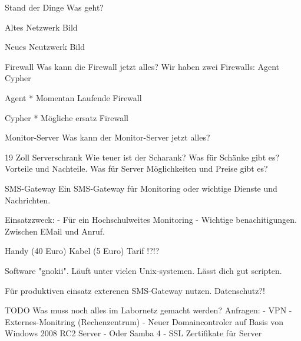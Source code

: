 \documentclass{beamer}
\author[J. Klemkow und B. Franzke]{Jan Klemkow und Benjamin Franzke}
\begin{document}
\begin{frame}{Stand der Dinge}
	Was geht?
\end{frame}

\begin{frame}{Altes Netzwerk}
	Bild
\end{frame}

\begin{frame}{Neues Neutzwerk}
	Bild
\end{frame}

\begin{frame}{Firewall}
	Was kann die Firewall jetzt alles?
	Wir haben zwei Firewalls:
		Agent
		Cypher
\end{frame}

\begin{frame}{Agent}
	* Momentan Laufende Firewall
\end{frame}

\begin{frame}{Cypher}
	* Mögliche ersatz Firewall
\end{frame}

\begin{frame}{Monitor-Server}
	Was kann der Monitor-Server jetzt alles?

\end{frame}

\begin{frame}{19 Zoll Serverschrank}
	Wie teuer ist der Scharank?
	Was für Schänke gibt es?
	Vorteile und Nachteile.
	Was für Server Möglichkeiten und Preise gibt es?
\end{frame}

\begin{frame}{SMS-Gateway}
	Ein SMS-Gateway für Monitoring oder wichtige Dienste und Nachrichten.

	Einsatzzweck:
		- Für ein Hochschulweites Monitoring
		- Wichtige benachitigungen. Zwischen EMail und Anruf.

	Handy (40 Euro)
	Kabel (5 Euro)
	Tarif !?!?

	Software "gnokii".
	Läuft unter vielen Unix-systemen.
	Lässt dich gut scripten.

	Für produktiven einsatz exterenen SMS-Gateway nutzen.
	Datenschutz?!
\end{frame}

\begin{frame}{TODO}
	Was muss noch alles im Labornetz gemacht werden?
	Anfragen:
	- VPN
	- Externes-Monitring (Rechenzentrum)
	- Neuer Domaincontroler auf Basis von Windows 2008 RC2 Server
	- Oder Samba 4
	- SSL Zertifikate für Server
\end{frame}
\end{document}
